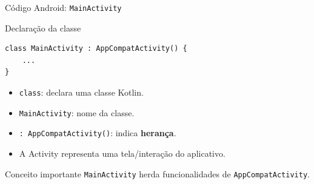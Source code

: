 \documentclass[aspectratio=169]{beamer}
\begin{document}
\begin{frame}[fragile]{Código Android: \texttt{MainActivity}}

\begin{block}{Declaração da classe}
\begin{verbatim}
class MainActivity : AppCompatActivity() {
    ...
}
\end{verbatim}
\end{block}

\vspace{0.3cm}
\scriptsize
{}

\vspace{0.3cm}

\begin{itemize}
    \item \texttt{class}: declara uma classe Kotlin.
    \item \texttt{MainActivity}: nome da classe.
    \item \texttt{: AppCompatActivity()}: indica \textbf{herança}.
    \item A Activity representa uma tela/interação do aplicativo.
\end{itemize}

\begin{alertblock}{Conceito importante}
\texttt{MainActivity} herda funcionalidades de
\texttt{AppCompatActivity}.
\end{alertblock}

\end{frame}
\end{document}

